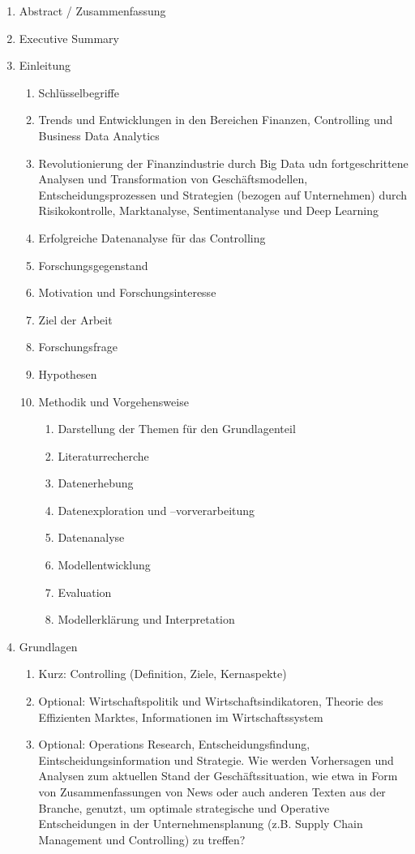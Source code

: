 \documentclass[lettersize,journal]{IEEEtran}
\begin{document}
\begin{enumerate}
  \item Abstract / Zusammenfassung
  \item Executive Summary
  \item Einleitung
  \begin{enumerate}
    \item Schlüsselbegriffe
    \item Trends und Entwicklungen in den Bereichen Finanzen, Controlling und Business Data Analytics
    \item Revolutionierung der Finanzindustrie durch Big Data udn fortgeschrittene Analysen und Transformation von Geschäftsmodellen, Entscheidungsprozessen und Strategien (bezogen auf Unternehmen) durch Risikokontrolle, Marktanalyse, Sentimentanalyse und Deep Learning
    \item Erfolgreiche Datenanalyse für das Controlling
    \item Forschungsgegenstand
    \item Motivation und Forschungsinteresse
    \item Ziel der Arbeit
    \item Forschungsfrage
    \item Hypothesen
    \item Methodik und Vorgehensweise
    \begin{enumerate}
      \item Darstellung der Themen für den Grundlagenteil
      \item Literaturrecherche
      \item Datenerhebung
      \item Datenexploration und –vorverarbeitung
      \item Datenanalyse
      \item Modellentwicklung
      \item Evaluation
      \item Modellerklärung und Interpretation
    \end{enumerate}
  \end{enumerate}
  \item Grundlagen
  \begin{enumerate}
    \item Kurz: Controlling (Definition, Ziele, Kernaspekte)
    \item Optional: Wirtschaftspolitik und Wirtschaftsindikatoren, Theorie des Effizienten Marktes, Informationen im Wirtschaftssystem
    \item Optional: Operations Research, Entscheidungsfindung, Eintscheidungsinformation und Strategie. Wie werden Vorhersagen und Analysen zum aktuellen Stand der Geschäftssituation, wie etwa in Form von Zusammenfassungen von News oder auch anderen Texten aus der Branche, genutzt, um optimale strategische und Operative Entscheidungen in der Unternehmensplanung (z.B. Supply Chain Management und Controlling) zu treffen?

\end{enumerate}
\end{enumerate}
\end{document}
